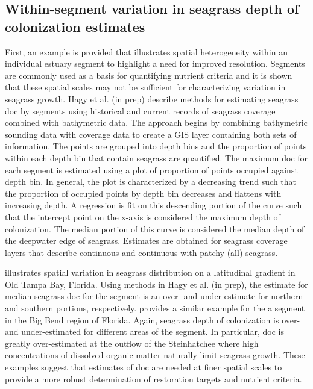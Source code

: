 \documentclass[letterpaper,12pt]{article}\usepackage[]{graphicx}\usepackage[]{color}
\begin{document}
\subsection{Within-segment variation in seagrass depth of colonization estimates}

First, an example is provided that illustrates spatial heterogeneity within an individual estuary segment to highlight a need for improved resolution.  Segments are commonly used as a basis for quantifying nutrient criteria and it is shown that these spatial scales  may not be sufficient for characterizing variation in seagrass growth. Hagy et al. (in prep) describe methods for estimating seagrass \ac{doc} by segments using historical and current records of seagrass coverage combined with bathymetric data.  The approach begins by combining bathymetric sounding data with coverage data to create a \ac{GIS} layer containing both sets of information.  The points are grouped into depth bins and the proportion of points within each depth bin that contain seagrass are quantified.  The maximum \ac{doc} for each segment is estimated using a plot of proportion of points occupied against depth bin.  In general, the plot is characterized by a decreasing trend such that the proportion of occupied points by depth bin decreases and flattens with increasing depth.  A regression is fit on this descending portion of the curve such that the intercept point on the x-axis is considered the maximum depth of colonization.  The median portion of this curve is considered the median depth of the deepwater edge of seagrass.  Estimates are obtained for seagrass coverage layers that describe continuous and continuous with patchy (all) seagrass.  

 illustrates spatial variation in seagrass distribution on a latitudinal gradient in Old Tampa Bay, Florida.  Using methods in Hagy et al. (in prep), the estimate for median seagrass \ac{doc} for the segment is an over- and under-estimate for northern and southern portions, respectively.   provides a similar example for the a segment in the Big Bend region of Florida.  Again, seagrass depth of colonization is over- and under-estimated for different areas of the segment.  In particular, \ac{doc} is greatly over-estimated at the outflow of the Steinhatchee where high concentrations of dissolved organic matter              naturally limit seagrass growth.  These examples suggest that estimates of \ac{doc} are needed at finer spatial scales to provide a more robust determination of restoration targets and nutrient criteria.
\end{document}
